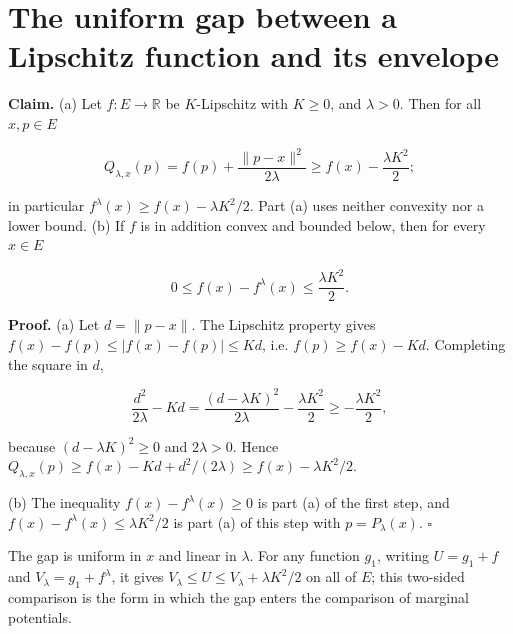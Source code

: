 \documentclass[11pt,a4paper]{article}
\begin{document}
\section{\texorpdfstring{The uniform gap between a Lipschitz function and its envelope}{The uniform gap between a Lipschitz function and its envelope}}


\textbf{Claim.} (a) Let \(f:E\to\mathbb R\) be \(K\)-Lipschitz with \(K\ge0\), and \(\lambda>0\). Then for all \(x,p\in E\)


\[Q_{\lambda,x}(p)=f(p)+\frac{\|p-x\|^2}{2\lambda}\ge f(x)-\frac{\lambda K^2}{2};\]


in particular \(f^\lambda(x)\ge f(x)-\lambda K^2/2\). Part (a) uses neither convexity nor a lower bound. (b) If \(f\) is in addition convex and bounded below, then for every \(x\in E\)


\[0\le f(x)-f^\lambda(x)\le\frac{\lambda K^2}{2}.\]


\textbf{Proof.} (a) Let \(d=\|p-x\|\). The Lipschitz property gives \(f(x)-f(p)\le|f(x)-f(p)|\le Kd\), i.e. \(f(p)\ge f(x)-Kd\). Completing the square in \(d\),


\[\frac{d^2}{2\lambda}-Kd=\frac{(d-\lambda K)^2}{2\lambda}-\frac{\lambda K^2}{2}\ge-\frac{\lambda K^2}{2},\]


because \((d-\lambda K)^2\ge0\) and \(2\lambda>0\). Hence \(Q_{\lambda,x}(p)\ge f(x)-Kd+d^2/(2\lambda)\ge f(x)-\lambda K^2/2\).




(b) The inequality \(f(x)-f^\lambda(x)\ge0\) is part (a) of the first step, and \(f(x)-f^\lambda(x)\le\lambda K^2/2\) is part (a) of this step with \(p=P_\lambda(x)\). \(\square\)




The gap is uniform in \(x\) and linear in \(\lambda\). For any function \(g_1\), writing \(U=g_1+f\) and \(V_\lambda=g_1+f^\lambda\), it gives \(V_\lambda\le U\le V_\lambda+\lambda K^2/2\) on all of \(E\); this two-sided comparison is the form in which the gap enters the comparison of marginal potentials.
\end{document}
